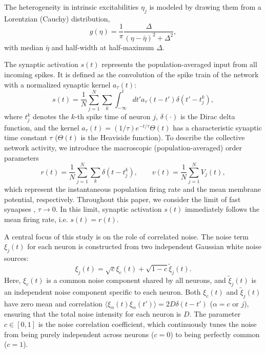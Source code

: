 \documentclass[aps,twocolumn,pre]{revtex4-2}
\begin{document}
The heterogeneity in intrinsic excitabilities $\eta_j$ is modeled by drawing them from a Lorentzian (Cauchy) distribution,
\begin{equation}
g(\eta) = \frac{1}{\pi} \frac{\Delta}{(\eta - \bar{\eta})^2 + \Delta^2},
\end{equation}
with median $\bar{\eta}$ and half-width at half-maximum $\Delta$.

The synaptic activation $s(t)$ represents the population-averaged input from all incoming spikes. It is defined as the convolution of the spike train of the network with a normalized synaptic kernel $a_\tau(t)$:
\begin{equation}
s(t) = \frac{1}{N} \sum_{j=1}^{N} \sum_{k} \int_{-\infty}^{t} dt' a_\tau(t - t')\delta(t' - t_j^k),
\end{equation}
where $t_j^k$ denotes the $k$-th spike time of neuron $j$, $\delta(\cdot)$ is the Dirac delta function, and the kernel $a_\tau(t) = (1/\tau) e^{-t/\tau} \Theta(t)$ has a characteristic synaptic time constant $\tau$ ($\Theta(t)$ is the Heaviside function). To describe the collective network activity, we introduce the macroscopic (population-averaged) order parameters
\begin{equation}
r(t) = \frac{1}{N}\sum_{j=1}^{N}\sum_{k}\delta(t - t_j^k), \qquad
v(t) = \frac{1}{N}\sum_{j=1}^{N} V_j(t),
\end{equation}
which represent the instantaneous population firing rate and the mean membrane potential, respectively.
Throughout this paper, we consider the limit of fast synapses , $\tau \to 0$. In this limit, synaptic activation $s(t)$ immediately follows the mean firing rate, i.e. $s(t) = r(t)$.


A central focus of this study is on the role of correlated noise. The noise term $\xi_j(t)$ for each neuron is constructed from two independent Gaussian white noise sources:
\begin{equation}
\xi_j(t) = \sqrt{c}\xi_c(t) + \sqrt{1-c}\tilde{\xi}_j(t).
\label{Eq:noise_decomposition}
\end{equation}
Here, $\xi_c(t)$ is a common noise component shared by all neurons, and $\tilde{\xi}_j(t)$ is an independent noise component specific to each neuron. Both $\xi_c(t)$ and $\tilde{\xi}_j(t)$ have zero mean and correlation $\langle \xi_\alpha(t) \xi_\alpha(t') \rangle = 2D \delta(t-t')$ ($\alpha = c$ or $j$), ensuring that the total noise intensity for each neuron is $D$. The parameter $c \in [0,1]$ is the noise correlation coefficient, which continuously tunes the noise from being purely independent across neurons ($c=0$) to being perfectly common ($c=1$).
\end{document}
